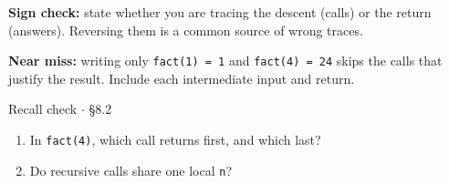 \documentclass[11pt]{article}
\begin{document}
\begin{keepsection}
\begin{notebox}\textbf{Sign check:} state whether you are tracing the descent (calls) or the return (answers). Reversing them is a common source of wrong traces.\end{notebox}

\begin{notebox}\textbf{Near miss:} writing only \texttt{fact(1) = 1} and \texttt{fact(4) = 24} skips the calls that justify the result. Include each intermediate input and return.\end{notebox}

\begin{recallbox}{Recall check \ensuremath{\cdot} §8.2}
\begin{enumerate}
\item In \texttt{fact(4)}, which call returns first, and which last?
\item Do recursive calls share one local \texttt{n}?
\end{enumerate}

\end{recallbox}
\end{keepsection}
\end{document}
